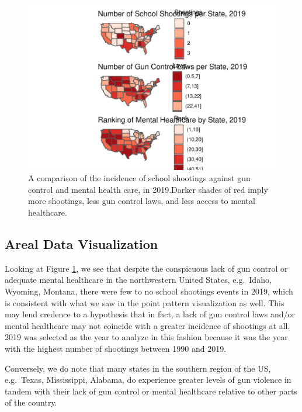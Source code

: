 \documentclass[12pt]{article}
\begin{document}
\begin{figure}
\centering
\includegraphics{JStevenRaquel_STATS295_Final_files/figure-latex/plot-areals-2019-1.pdf}
\caption{\label{fig:plot-areals-2019}A comparison of the incidence of school shootings against gun control and mental health care, in 2019.Darker shades of red imply more shootings, less gun control laws, and less access to mental healthcare.}
\end{figure}

\hypertarget{areal-data-visualization}{%
\subsection{Areal Data Visualization}\label{areal-data-visualization}}

Looking at Figure \ref{fig:plot-areals-2019}, we see that despite the conspicuous lack of gun control or adequate mental healthcare in the northwestern United States, e.g.~Idaho, Wyoming, Montana, there were few to no school shootings events in 2019, which is consistent with what we saw in the point pattern visualization as well. This may lend credence to a hypothesis that in fact, a lack of gun control laws and/or mental healthcare may not coincide with a greater incidence of shootings at all. 2019 was selected as the year to analyze in this fashion because it was the year with the highest number of shootings between 1990 and 2019.

Conversely, we do note that many states in the southern region of the US, e.g.~Texas, Mississippi, Alabama, do experience greater levels of gun violence in tandem with their lack of gun control or mental healthcare relative to other parts of the country.
\end{document}
